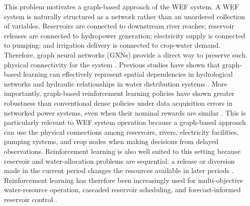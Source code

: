 \documentclass [a4paper,fleqn] {cas-dc}
\begin{document}
This problem motivates a graph-based approach of the WEF system. A WEF system is naturally structured as a network rather than an unordered collection of variables. Reservoirs are connected to downstream river reaches; reservoir releases are connected to hydropower generation; electricity supply is connected to pumping; and irrigation delivery is connected to crop-water demand. Therefore, graph neural networks (GNNs) provide a direct way to preserve such physical connectivity for the system \citep{velickovic2018,jiang2020,niu2021,mei2026}. Previous studies have shown that graph-based learning can effectively represent spatial dependencies in hydrological networks \citep{Sun2021HydrologyGNN} and hydraulic relationships in water distribution systems \citep{Truong2024WDNGNN}. More importantly, graph-based reinforcement learning policies have shown greater robustness than conventional dense policies under data acquisition errors in networked power systems, even when their nominal rewards are similar \citep{Lee2022GraphPolicyVoltVar}. This is particularly relevant to WEF system operation because a graph-based approach can use the physical connections among reservoirs, rivers, electricity facilities, pumping systems, and crop nodes when making decisions from delayed observations. Reinforcement learning is also well suited to this setting because reservoir and water-allocation problems are sequential: a release or diversion made in the current period changes the resources available in later periods \citep{haarnoja2018}. Reinforcement learning has therefore been increasingly used for multi-objective water-resource operation, cascaded reservoir scheduling, and forecast-informed reservoir control \citep{Castelletti2013MultiobjectiveRL,Xu2020CascadedReservoirDRL,Zanutto2025ForecastRL,Wu2024TransformerDRLReservoir,Xie2026LongHorizonReservoirDRL,hooshyar2020}.

\end{document}
